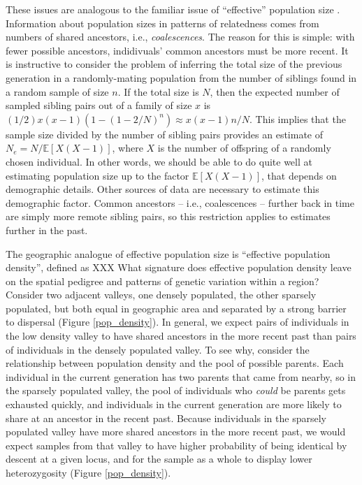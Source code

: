 \documentclass{ar-1col}
\newcommand{\E}{\mathbb{E}}
\begin{document}
These issues are analogous to the familiar
issue of ``effective'' population size \citep{CharlesworthCharlesworthBarton2003}.
Information about population sizes in patterns of relatedness
comes from numbers of shared ancestors, i.e., \textit{coalescences}.
The reason for this is simple:
with fewer possible ancestors,
indidivuals' common ancestors must be more recent.
It is instructive to consider 
the problem of inferring the total size of the previous generation
in a randomly-mating population
from the number of siblings found in a random sample of size $n$.
If the total size is $N$, 
then the expected number of sampled sibling pairs out of a family of size $x$
is $(1/2) x (x-1) (1 - (1 - 2/N)^n) \approx x (x-1) n / N$.
This implies that the sample size divided by the number of sibling pairs 
provides an estimate of $N_e = N/\E[X(X-1)]$, where $X$ is the number of offspring
of a randomly chosen individual.
In other words, we should be able to do quite well at estimating population size
up to the factor $\E[X(X-1)]$, that depends on demographic details.
Other sources of data are necessary to estimate this demographic factor.
Common ancestors -- i.e., coalescences --
further back in time are simply more remote sibling pairs,
so this restriction applies to estimates further in the past.

The geographic analogue of effective population size
is ``effective population density'',
defined as XXX
What signature does effective population density leave 
on the spatial pedigree and patterns of genetic variation
within a region?
Consider two adjacent valleys, 
one densely populated, the other sparsely populated, 
but both equal in geographic area 
and separated by a strong barrier to dispersal (Figure \ref{pop_density}).
In general, we expect pairs of individuals in the low density valley 
to have shared ancestors in the more recent past than 
pairs of individuals in the densely populated valley.
To see why, consider the relationship between population density
and the pool of possible parents.
Each individual in the current generation has two parents that came from nearby,
so in the sparsely populated valley,
the pool of individuals who \textit{could} be parents gets exhausted quickly,
and individuals in the current generation
are more likely to share at an ancestor in the recent past.
Because individuals in the sparsely populated valley have more shared ancestors 
in the more recent past, 
we would expect samples from that valley to have higher probability of being identical by descent 
at a given locus, 
and for the sample as a whole to display lower heterozygosity (Figure \ref{pop_density}).
\end{document}
